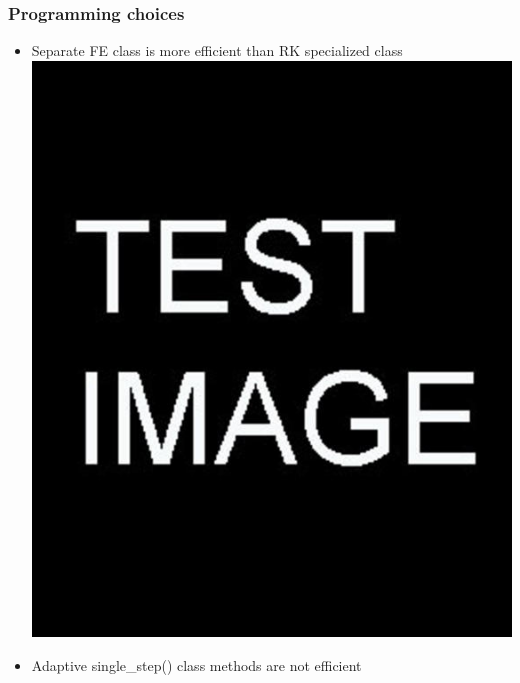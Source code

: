 \documentclass{beamer}
\begin{document}
\begin{frame} %
	\frametitle{Programming choices}
	\begin{itemize}
		\item Separate FE class is more efficient than RK specialized class
		\includegraphics[scale=0.2]{etc/test.jpg}
		\item Adaptive single\_step() class methods are not efficient
	\end{itemize}
\end{frame}
\end{document}
